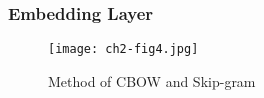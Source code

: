 \subsubsection{Embedding Layer}



\begin{figure}[h]
	\centering
	\texttt{[image: ch2-fig4.jpg]}
	\caption{Method of CBOW and Skip-gram}
	\label{ch2-fig4}
\end{figure}




